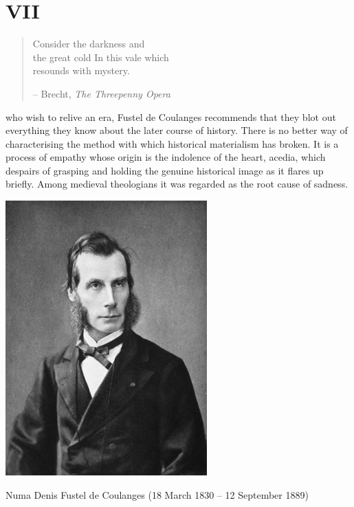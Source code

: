 \documentclass[12pt]{tufte-handout}
\begin{document}
\section{VII}	 
\begin{quote}
Consider the darkness and \\ the great cold
In this vale which \\ resounds with mystery.


-- Brecht, \textit{The Threepenny Opera}
\end{quote}	 	 
 who wish to relive an era, Fustel de Coulanges recommends that they blot out everything they know about the later course of history. 
There is no better way of characterising the method with which historical materialism has broken. It is a process of empathy whose origin is the indolence of the heart, acedia, which despairs of grasping and holding the genuine historical image as it flares up briefly. Among medieval theologians it was regarded as the root cause of sadness.
\begin{marginfigure}%
  \includegraphics[width=\linewidth]{graphics/Numa_Fustel_de_Coulanges.jpg}
  \caption{Numa Denis Fustel de Coulanges (18 March 1830 – 12 September 1889) }
  \label{fig:deCoulanges}
\end{marginfigure}
\end{document}
